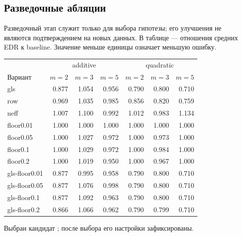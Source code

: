 \subsection{Разведочные абляции}
Разведочный этап служит только для выбора гипотезы; его улучшения не являются подтверждением на новых данных.
В таблице --- отношения средних EDR к baseline. Значение меньше единицы означает меньшую ошибку.
\begin{center}\small\setlength{\tabcolsep}{4pt}
\begin{tabular}{@{}lrrrrrr@{}}\toprule
 & \multicolumn{3}{c}{additive} & \multicolumn{3}{c}{quadratic}\\
Вариант & $m=2$ & $m=3$ & $m=5$ & $m=2$ & $m=3$ & $m=5$\\\midrule
gls & 0.877 & 1.054 & 0.956 & 0.790 & 0.800 & 0.710\\
row & 0.969 & 1.035 & 0.985 & 0.856 & 0.820 & 0.759\\
neff & 1.007 & 1.100 & 0.992 & 1.012 & 0.983 & 1.134\\
floor0.01 & 1.000 & 1.000 & 1.000 & 1.000 & 1.000 & 1.000\\
floor0.05 & 1.000 & 1.027 & 0.972 & 1.000 & 0.973 & 1.000\\
floor0.1 & 1.000 & 1.029 & 0.972 & 1.000 & 0.984 & 1.000\\
floor0.2 & 1.000 & 1.019 & 0.950 & 1.000 & 0.967 & 1.000\\
gls-floor0.01 & 0.877 & 0.995 & 0.958 & 0.790 & 0.800 & 0.710\\
gls-floor0.05 & 0.877 & 1.076 & 0.998 & 0.790 & 0.800 & 0.710\\
gls-floor0.1 & 0.877 & 1.092 & 0.963 & 0.790 & 0.800 & 0.710\\
gls-floor0.2 & 0.866 & 1.066 & 0.962 & 0.790 & 0.799 & 0.710\\
\bottomrule\end{tabular}\end{center}
Выбран кандидат ; после выбора его настройки зафиксированы.
